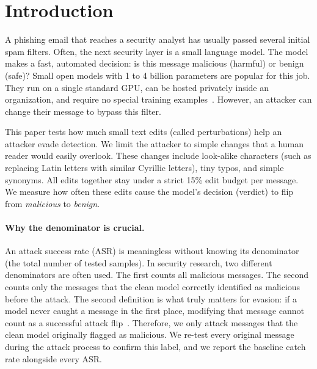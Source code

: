 \section{Introduction}

A phishing email that reaches a security analyst has usually passed several
initial spam filters. Often, the next security layer is a small language model.
The model makes a fast, automated decision: is this message malicious (harmful)
or benign (safe)? Small open models with 1 to 4
billion parameters are popular for this job. They run on a single standard GPU,
can be hosted privately inside an organization, and require no special training
examples~\cite{rojas2024zeroshot,koide2024chatspamdetector}. However, an attacker
can change their message to bypass this filter.

This paper tests how much small text edits (called perturbations) help an
attacker evade detection. We limit the attacker to simple changes that a human
reader would easily overlook. These changes include look-alike characters (such
as replacing Latin letters with similar Cyrillic letters), tiny typos, and simple
synonyms. All edits together stay under a strict 15\% edit budget per message. We measure how often these edits cause the model's decision (verdict)
to flip from \emph{malicious} to \emph{benign}.

\paragraph{Why the denominator is crucial.}
An attack success rate (ASR) is meaningless without knowing its denominator
(the total number of tested samples). In security research, two different
denominators are often used. The first counts all malicious messages. The
second counts only the messages that the clean model correctly identified as
malicious before the attack. The second definition is what truly matters for
evasion: if a model never caught a message in the first place, modifying that
message cannot count as a successful attack flip~\cite{morris2020textattack}.
Therefore, we only attack messages that the clean model originally flagged as
malicious. We re-test every original message during the attack process to
confirm this label, and we report the baseline catch rate alongside every ASR.

